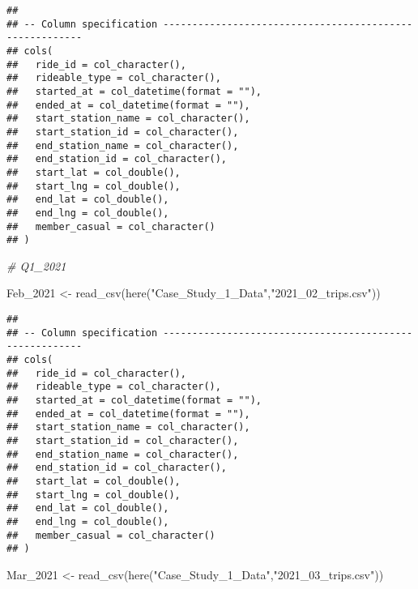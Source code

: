 \documentclass[
]{article}
\newenvironment{Shaded}{\begin{snugshade}}{\end{snugshade}}
\newcommand{\CommentTok}[1]{\textcolor[rgb]{0.56,0.35,0.01}{\textit{#1}}}
\newcommand{\FunctionTok}[1]{\textcolor[rgb]{0.00,0.00,0.00}{#1}}
\newcommand{\NormalTok}[1]{#1}
\newcommand{\OtherTok}[1]{\textcolor[rgb]{0.56,0.35,0.01}{#1}}
\newcommand{\StringTok}[1]{\textcolor[rgb]{0.31,0.60,0.02}{#1}}
\begin{document}
\begin{verbatim}
## 
## -- Column specification --------------------------------------------------------
## cols(
##   ride_id = col_character(),
##   rideable_type = col_character(),
##   started_at = col_datetime(format = ""),
##   ended_at = col_datetime(format = ""),
##   start_station_name = col_character(),
##   start_station_id = col_character(),
##   end_station_name = col_character(),
##   end_station_id = col_character(),
##   start_lat = col_double(),
##   start_lng = col_double(),
##   end_lat = col_double(),
##   end_lng = col_double(),
##   member_casual = col_character()
## )
\end{verbatim}

\begin{Shaded}
\begin{Highlighting}[]
\CommentTok{\# Q1\_2021}
\end{Highlighting}
\end{Shaded}

\begin{Shaded}
\begin{Highlighting}[]
\NormalTok{ Feb\_2021 }\OtherTok{\textless{}{-}} \FunctionTok{read\_csv}\NormalTok{(}\FunctionTok{here}\NormalTok{(}\StringTok{"Case\_Study\_1\_Data"}\NormalTok{,}\StringTok{"2021\_02\_trips.csv"}\NormalTok{))}
\end{Highlighting}
\end{Shaded}

\begin{verbatim}
## 
## -- Column specification --------------------------------------------------------
## cols(
##   ride_id = col_character(),
##   rideable_type = col_character(),
##   started_at = col_datetime(format = ""),
##   ended_at = col_datetime(format = ""),
##   start_station_name = col_character(),
##   start_station_id = col_character(),
##   end_station_name = col_character(),
##   end_station_id = col_character(),
##   start_lat = col_double(),
##   start_lng = col_double(),
##   end_lat = col_double(),
##   end_lng = col_double(),
##   member_casual = col_character()
## )
\end{verbatim}

\begin{Shaded}
\begin{Highlighting}[]
\NormalTok{ Mar\_2021 }\OtherTok{\textless{}{-}} \FunctionTok{read\_csv}\NormalTok{(}\FunctionTok{here}\NormalTok{(}\StringTok{"Case\_Study\_1\_Data"}\NormalTok{,}\StringTok{"2021\_03\_trips.csv"}\NormalTok{))}
\end{Highlighting}
\end{Shaded}
\end{document}
